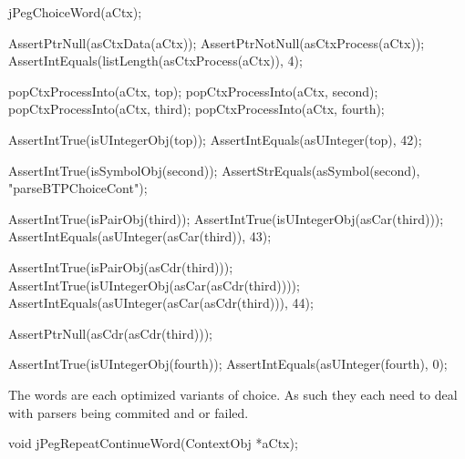   jPegChoiceWord(aCtx);
  
  AssertPtrNull(asCtxData(aCtx));
  AssertPtrNotNull(asCtxProcess(aCtx));
  AssertIntEquals(listLength(asCtxProcess(aCtx)), 4);
  
  popCtxProcessInto(aCtx, top);
  popCtxProcessInto(aCtx, second);
  popCtxProcessInto(aCtx, third);
  popCtxProcessInto(aCtx, fourth);
  
  AssertIntTrue(isUIntegerObj(top));
  AssertIntEquals(asUInteger(top), 42);    

  AssertIntTrue(isSymbolObj(second));
  AssertStrEquals(asSymbol(second), "parseBTPChoiceCont");
  
  AssertIntTrue(isPairObj(third));
  AssertIntTrue(isUIntegerObj(asCar(third)));
  AssertIntEquals(asUInteger(asCar(third)), 43);
  
  AssertIntTrue(isPairObj(asCdr(third)));
  AssertIntTrue(isUIntegerObj(asCar(asCdr(third))));
  AssertIntEquals(asUInteger(asCar(asCdr(third))), 44);
  
  AssertPtrNull(asCdr(asCdr(third)));
  
  AssertIntTrue(isUIntegerObj(fourth));
  AssertIntEquals(asUInteger(fourth), 0);
\stopCTest
\stopTestCase
\stopTestSuite

The  words are each optimized variants of 
choice. As such they each need to deal with parsers being commited and or 
failed. 

\startTestSuite[jPegRepeatContinueWord]

\startCHeader
void jPegRepeatContinueWord(ContextObj *aCtx);
\stopCHeader

